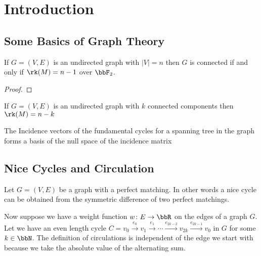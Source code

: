 \chapter{Introduction}
\section{Some Basics of Graph Theory}
\begin{Theorem}{}{}
	If $G=(V,E)$ is an undirected graph with $|V|=n$ then $G$ is connected if and only if $\rk(M)=n-1$ over $\bbF_2$.
\end{Theorem}
\begin{proof}
\end{proof}
\begin{corolary}{}{}
	If $G=(V,E)$ is an undirected graph with $k$ connected components then $\rk(M)=n-k$
\end{corolary}
\begin{Theorem}{}{}
	The Incidence vectors of the  fundamental cycles for a spanning tree in the graph forms a basis of the null space of the incidence matrix
\end{Theorem}
\section{Nice Cycles and Circulation}
Let $G=(V,E)$ be a graph with a perfect matching. 
\parinf In other words a nice cycle can be obtained from the symmetric difference of two perfect matchings.\parinn

Now suppose we have a weight function $w\colon E\to \bbR$ on the edges of a graph $G$. Let we have an even length cycle $C=v_0\overset{e_0}{\longrightarrow}v_1\overset{e_1}{\longrightarrow}\cdots \overset{e_{2k-2}}{\longrightarrow}v_{2k}\overset{e_{2k-1}}{\longrightarrow}v_0$ in $G$ for some $k\in \bbN$.
The definition of circulations is independent of the edge we start with because we take the absolute value of the alternating sum.